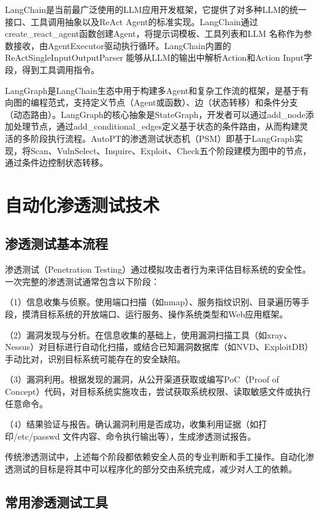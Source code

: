 LangChain\cite{LangChain}是当前最广泛使用的LLM应用开发框架，它提供了对多种LLM的统一接口、工具调用抽象以及ReAct Agent的标准实现。LangChain通过create\_react\_agent函数创建Agent，将提示词模板、工具列表和LLM 名称作为参数接收，由AgentExecutor驱动执行循环。LangChain内置的ReActSingleInputOutputParser 能够从LLM的输出中解析Action和Action Input字段，得到工具调用指令。

LangGraph是LangChain生态中用于构建多Agent和复杂工作流的框架，是基于有向图的编程范式，支持定义节点（Agent或函数）、边（状态转移）和条件分支（动态路由）。LangGraph的核心抽象是StateGraph，开发者可以通过add\_node添加处理节点，通过add\_conditional\_edges定义基于状态的条件路由，从而构建灵活的多阶段执行流程。AutoPT的渗透测试状态机（PSM）即基于LangGraph实现，将Scan、VulnSelect、Inquire、Exploit、Check五个阶段建模为图中的节点，通过条件边控制状态转移。

\section{自动化渗透测试技术}

\subsection{渗透测试基本流程}

渗透测试（Penetration Testing）通过模拟攻击者行为来评估目标系统的安全性。一次完整的渗透测试通常包含以下阶段\cite{Liu2024AutoScan}\cite{Wu2023PenTest}：

（1）信息收集与侦察。使用端口扫描（如nmap）、服务指纹识别、目录遍历等手段，摸清目标系统的开放端口、运行服务、操作系统类型和Web应用框架。

（2）漏洞发现与分析。在信息收集的基础上，使用漏洞扫描工具（如xray、Nessus）对目标进行自动化扫描，或结合已知漏洞数据库（如NVD、ExploitDB）手动比对，识别目标系统可能存在的安全缺陷。

（3）漏洞利用。根据发现的漏洞，从公开渠道获取或编写PoC（Proof of Concept）代码，对目标系统实施攻击，尝试获取系统权限、读取敏感文件或执行任意命令。

（4）结果验证与报告。确认漏洞利用是否成功，收集利用证据（如打印/etc/passwd 文件内容、命令执行输出等），生成渗透测试报告。

传统渗透测试中，上述每个阶段都依赖安全人员的专业判断和手工操作。自动化渗透测试的目标是将其中可以程序化的部分交由系统完成，减少对人工的依赖。

\subsection{常用渗透测试工具}

